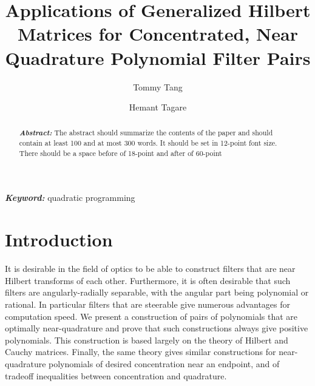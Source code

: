 \documentclass[final,3p]{CSP}
\theoremstyle{definition}
\theoremstyle{remark}
\numberwithin{equation}{section}
\begin{document}
\begin{frontmatter}

\title{Applications of Generalized Hilbert Matrices for Concentrated, Near Quadrature Polynomial Filter Pairs}

\author[mymainaddress]{Tommy Tang}

\author[mymainaddress,mysecondaryaddress]{Hemant Tagare}


\address[mymainaddress]{300 Cedar Street}
\address[mysecondaryaddress]{Radiology}
\begin{keyword}\rm
\begin{adjustwidth}{2cm}{2cm}{\itshape\textbf{Keyword:}}  
quadratic programming
\end{adjustwidth}
\end{keyword}

\begin{abstract}\rm
\begin{adjustwidth}{2cm}{2cm}{\itshape\textbf{Abstract:}} 
The abstract should summarize the contents of the paper and should contain at least 100 and at most 300 words. It should be set in 12-point font size. There should be a space before of 18-point and after of 60-point
\end{adjustwidth}
\end{abstract}
\end{frontmatter}

\section{Introduction}
\label{}
\noindent
It is desirable in the field of optics to be able to construct filters that are near Hilbert transforms of each other. Furthermore, it is often desirable that such filters are angularly-radially separable, with the angular part being polynomial or rational. In particular filters that are steerable give numerous advantages for computation speed. 
We present a construction of pairs of polynomials that are optimally near-quadrature and prove that such constructions always give positive polynomials. This construction is based largely on the theory of Hilbert and Cauchy matrices. Finally, the same theory gives similar constructions for near-quadrature polynomials of desired concentration near an endpoint, and of tradeoff inequalities between concentration and quadrature. 
\end{document}
